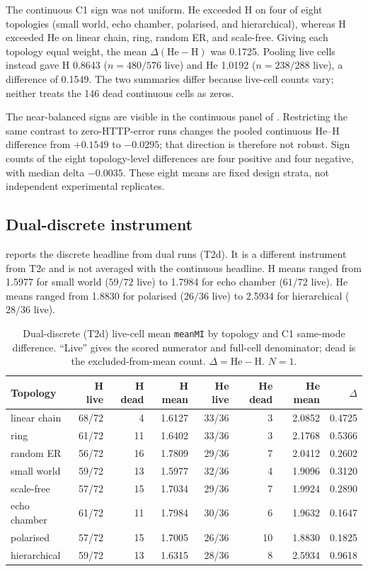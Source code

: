 The continuous C1 sign was not uniform.  He exceeded H on four of eight
topologies (small world, echo chamber, polarised, and hierarchical), whereas H
exceeded He on linear chain, ring, random ER, and scale-free.  Giving each
topology equal weight, the mean $\Delta(\mathrm{He}-\mathrm{H})$ was 0.1725.
Pooling live cells instead gave H 0.8643 ($n=480/576$ live) and He 1.0192
($n=238/288$ live), a difference of 0.1549.  The two summaries differ because
live-cell counts vary; neither treats the 146 dead continuous cells as zeros.

The near-balanced signs are visible in the continuous panel of
. Restricting the same contrast to zero-HTTP-error runs
changes the pooled continuous He--H difference from \(+0.1549\) to
\(-0.0295\); that direction is therefore not robust. Sign counts of the eight
topology-level differences are four positive and four negative, with median
delta \(-0.0035\). These eight means are fixed design strata, not independent
experimental replicates.

\subsection{Dual-discrete instrument}
\label{sec:results-topology-dual}

 reports the discrete headline from dual runs (T2d).
It is a different instrument from T2c and is not averaged with the continuous
headline.  H means ranged from 1.5977 for small world ($59/72$ live) to 1.7984
for echo chamber ($61/72$ live).  He means ranged from 1.8830 for polarised
($26/36$ live) to 2.5934 for hierarchical ($28/36$ live).

\begin{table}[t]
\centering
\caption{Dual-discrete (T2d) live-cell mean \texttt{meanMI} by topology and C1
same-mode difference.  ``Live'' gives the scored numerator and full-cell
denominator; dead is the excluded-from-mean count.  $\Delta=\mathrm{He}-\mathrm{H}$.
$N=1$.}
\label{tab:topology-dual}
\scriptsize
\begin{tabular}{lrrrrrrr}
\toprule
Topology & H live & H dead & H mean & He live & He dead & He mean & $\Delta$ \\
\midrule
linear chain & 68/72 & 4  & 1.6127 & 33/36 & 3  & 2.0852 & 0.4725 \\
ring         & 61/72 & 11 & 1.6402 & 33/36 & 3  & 2.1768 & 0.5366 \\
random ER    & 56/72 & 16 & 1.7809 & 29/36 & 7  & 2.0412 & 0.2602 \\
small world  & 59/72 & 13 & 1.5977 & 32/36 & 4  & 1.9096 & 0.3120 \\
scale-free   & 57/72 & 15 & 1.7034 & 29/36 & 7  & 1.9924 & 0.2890 \\
echo chamber & 61/72 & 11 & 1.7984 & 30/36 & 6  & 1.9632 & 0.1647 \\
polarised    & 57/72 & 15 & 1.7005 & 26/36 & 10 & 1.8830 & 0.1825 \\
hierarchical & 59/72 & 13 & 1.6315 & 28/36 & 8  & 2.5934 & 0.9618 \\
\bottomrule
\end{tabular}
\end{table}

